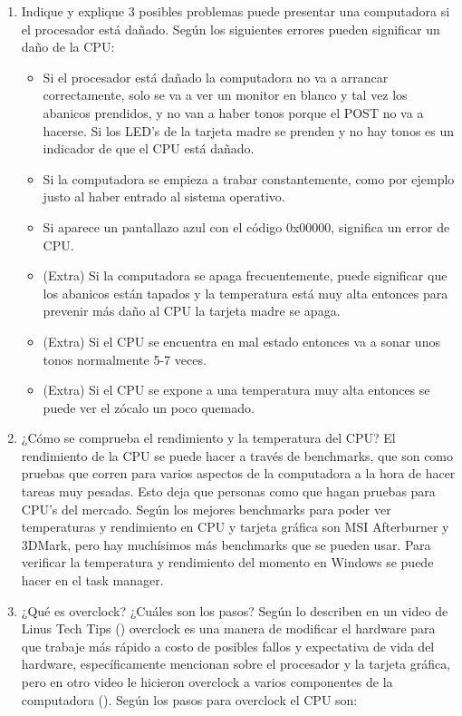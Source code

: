 \documentclass[stu, 12pt, letterpaper, donotrepeattitle, floatsintext, natbib, helv]{apa7}
\begin{document}
\begin{enumerate}
    \item Indique y explique 3 posibles problemas puede presentar una computadora si el procesador está dañado. Según \cite{CPUFallos} los siguientes errores pueden significar un daño de la CPU:
    \begin{itemize}
        \item Si el procesador está dañado la computadora no va a arrancar correctamente, solo se va a ver un monitor en blanco y tal vez los abanicos prendidos, y no van a haber tonos porque el POST no va a hacerse. Si los LED's de la tarjeta madre se prenden y no hay tonos es un indicador de que el CPU está dañado.
        \item Si la computadora se empieza a trabar constantemente, como por ejemplo justo al haber entrado al sistema operativo.
        \item Si aparece un pantallazo azul con el código 0x00000, significa un error de CPU. 
        \item (Extra) Si la computadora se apaga frecuentemente, puede significar que los abanicos están tapados y la temperatura está muy alta entonces para prevenir más daño al CPU la tarjeta madre se apaga.
        \item (Extra) Si el CPU se encuentra en mal estado entonces va a sonar unos tonos normalmente 5-7 veces.
        \item (Extra) Si el CPU se expone a una temperatura muy alta entonces se puede ver el zócalo un poco quemado.
    \end{itemize}
    \item ¿Cómo se comprueba el rendimiento y la temperatura del CPU? El rendimiento de la CPU se puede hacer a través de benchmarks, que son como pruebas que corren para varios aspectos de la computadora a la hora de hacer tareas muy pesadas. Esto deja que personas como \cite{gamersNexusBenchmarks} que hagan pruebas para CPU's del mercado. Según \cite{redditBenchmarks} los mejores benchmarks para poder ver temperaturas y rendimiento en CPU y tarjeta gráfica son MSI Afterburner y 3DMark, pero hay muchísimos más benchmarks que se pueden usar. Para verificar la temperatura y rendimiento del momento en Windows se puede hacer en el task manager.
    \item ¿Qué es overclock? ¿Cuáles son los pasos? Según lo describen en un video de Linus Tech Tips (\cite{OverclockingLTT}) overclock es una manera de modificar el hardware para que trabaje más rápido a costo de posibles fallos y expectativa de vida del hardware, específicamente mencionan sobre el procesador y la tarjeta gráfica, pero en otro video le hicieron overclock a varios componentes de la computadora (\cite{Tips2018Jun}). Según \cite{InsiderOverclockGuide} los pasos para overclock el CPU son:

\end{enumerate}
\end{document}
